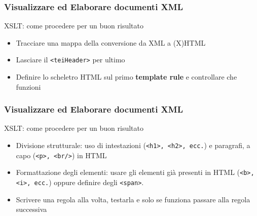 \begin{frame}
    \frametitle{Visualizzare ed Elaborare documenti XML}
    \addtocounter{nframe}{1}
    

     \begin{block}{XSLT: come procedere per un buon risultato}
         \begin{itemize}
            \item Tracciare una mappa della conversione da XML a (X)HTML
             \item Lasciare il \texttt{<teiHeader>} per ultimo
             \item Definire lo scheletro HTML sul primo \textbf{template rule} e controllare che funzioni
        \end{itemize}
     \end{block}
    
\end{frame}

\begin{frame}
    \frametitle{Visualizzare ed Elaborare documenti XML}
    \addtocounter{nframe}{1}
    

     \begin{block}{XSLT: come procedere per un buon risultato}
         \begin{itemize}
             \item Divisione strutturale: uso di intestazioni (\texttt{<h1>, <h2>, ecc.}) e
             paragrafi, a capo (\texttt{<p>, <br/>}) in HTML
             \item Formattazione degli elementi: usare gli elementi già presenti in
             HTML (\texttt{<b>, <i>, ecc.}) oppure definire degli \texttt{<span>}.
             \item Scrivere una regola alla volta, testarla e solo se funziona passare alla
             regola successiva
        \end{itemize}
     \end{block}
    
\end{frame}


